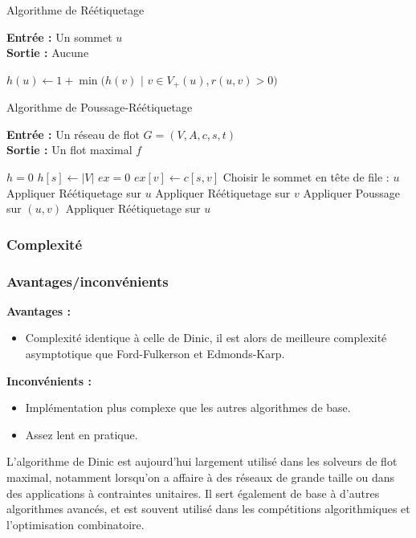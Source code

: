 \documentclass[a4paper]{article}
\begin{document}
\begin{algorithm}[H]
	\caption{Algorithme de Réétiquetage}
	\textbf{Entrée :} Un sommet $u$ \\
	\textbf{Sortie :} Aucune
	\begin{algorithmic}[1]
		\State $h(u) \gets 1 + \min(h(v)$ $|$ $v \in V_+(u), r(u,v)>0 )$
	\end{algorithmic}
\end{algorithm}

\begin{algorithm}[H]
	\caption{Algorithme de Poussage-Réétiquetage}
	\textbf{Entrée :} Un réseau de flot $G = (V, A, c, s, t)$ \\
	\textbf{Sortie :} Un flot maximal $f$
	\begin{algorithmic}[1]
		\State $h = ${$0 $}
		\State $h[s] \gets |V|$
		\State $ex = ${$0 $}
			\State $ex[v] \gets c[s,v]$
		\EndFor
			\State Choisir le sommet en tête de file : $u$
			\State Appliquer Réétiquetage sur $u$
				\State Appliquer Réétiquetage sur $v$
					\State Appliquer Poussage sur $(u,v)$
				\EndIf
			\EndFor
			\State Appliquer Réétiquetage sur $u$
		\EndWhile
		
	\end{algorithmic}
\end{algorithm}

\subsubsection{Complexité}

\subsubsection{Avantages/inconvénients}
\textbf{Avantages :}
\begin{itemize}
	\item Complexité identique à celle de Dinic, il est alors de meilleure complexité asymptotique que Ford-Fulkerson et Edmonds-Karp.
\end{itemize}

\textbf{Inconvénients :}
\begin{itemize}
	\item Implémentation plus complexe que les autres algorithmes de base.
	\item Assez lent en pratique.
\end{itemize}
L’algorithme de Dinic est aujourd’hui largement utilisé dans les solveurs de flot maximal, notamment lorsqu’on a affaire à des réseaux de grande taille ou dans des applications à contraintes unitaires. Il sert également de base à d’autres algorithmes avancés, et est souvent utilisé dans les compétitions algorithmiques et l’optimisation combinatoire\cite{article}.
\end{document}
